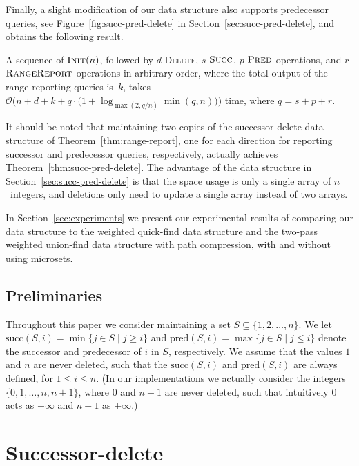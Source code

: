 \documentclass[a4paper]{lipics-v2021}
\newcommand{\Oh}{\mathcal{O}}
\newcommand{\successor}{\mathrm{succ}}
\newcommand{\predecessor}{\mathrm{pred}}
\newcommand{\FuncName}[1]{\textup{\textsc{#1}}}
\newcommand{\Init}{\FuncName{Init}}
\newcommand{\Delete}{\FuncName{Delete}}
\newcommand{\Succ}{\FuncName{Succ}}
\newcommand{\Pred}{\FuncName{Pred}}
\newcommand{\RangeReport}{\FuncName{RangeReport}}
\begin{document}
Finally, a slight modification of our data structure also supports predecessor queries, see Figure~\ref{fig:succ-pred-delete} in Section~\ref{sec:succ-pred-delete}, and obtains the following result.

\begin{theorem}
  \label{thm:succ-pred-delete}
  A sequence of $\Init(n)$, followed by $d$ \Delete, $s$ $\Succ$, $p$ $\Pred$ operations, and $r$ $\RangeReport$ operations in arbitrary order, where the total output of the range reporting queries is~$k$, takes $\Oh\big(n+d+k+q\cdot \big(1+\log_{\max(2,q/n)} \min(q,n)\big)\big)$ time, where $q=s+p+r$.
\end{theorem}

It should be noted that maintaining two copies of the successor-delete data structure of Theorem~\ref{thm:range-report}, one for each direction for reporting successor and predecessor queries, respectively, actually achieves Theorem~\ref{thm:succ-pred-delete}. The advantage of the data structure in Section~\ref{sec:succ-pred-delete} is that the space usage is only a single array of $n$~integers, and deletions only need to update a single array instead of two arrays.

In Section~\ref{sec:experiments} we present our experimental results of comparing our data structure to the weighted quick-find data structure and the two-pass weighted union-find data structure with path compression, with and without using microsets.

\subsection{Preliminaries}

Throughout this paper we consider maintaining a set $S \subseteq \{1,2,\ldots,n\}$. We let $\successor(S, i)=\min\{j \in S \mid j \geq i\}$ and $\predecessor(S, i)=\max\{j \in S \mid j \leq i\}$ denote the successor and predecessor of $i$ in $S$, respectively. We assume that the values $1$ and $n$ are never deleted, such that the $\successor(S, i)$ and $\predecessor(S, i)$ are always defined, for $1 \leq i \leq n$. (In our implementations we actually consider the integers $\{0,1,\ldots,n,n+1\}$, where $0$ and $n+1$ are never deleted, such that intuitively $0$ acts as $-\infty$ and $n+1$ as $+\infty$.)

\section{Successor-delete}
\label{sec:succ-delete}
\end{document}
